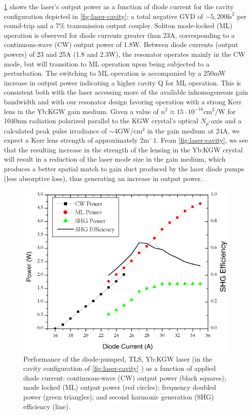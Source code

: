 \ref{fig:laser-performance} shows the laser's output power as a function of diode current for the cavity configuration depicted in \ref{fig:laser-cavity}; a total negative GVD of $-5,200\text{fs}^2$ per round-trip and a 7\% transmission output coupler.
Soliton mode-locked (ML) operation is observed for diode currents greater than 23A, corresponding to a continuous-wave (CW) output power of 1.8W.
Between diode currents (output powers) of 23 and 25A (1.8 and 2.3W), the resonator operates mainly in the CW mode, but will transition to ML operation upon being subjected to a perturbation.
The switching to ML operation is accompanied by a 250mW increase in output
power indicating a higher cavity Q for ML operation.
This is consistent both with the laser accessing more of the available inhomogeneous gain bandwidth and with our resonator design favoring operation with a strong Kerr lens in the Yb:KGW gain medium.
Given a value of $n^2 \approx 15 \cdot 10^{-16}\text{cm}^2/\text{W}$ for 1040nm radiation polarized parallel to the KGW crystal's optical $N_p$-axis \cite{Major_characterization_2003,Selivanov_nonlinear_2006,Vodchits_zscan_2006} and a calculated peak pulse irradiance of $\sim$4GW/cm$^2$ in the gain medium at 24A, we expect a Kerr lens strength of approximately 2m$^-1$.
From \ref{fig:laser-cavity}, we see that the resulting increase in the strength of the lensing in the Yb:KGW crystal will result in a reduction of the laser mode size in the gain medium, which produces a better spatial match to gain duct produced by the laser diode pumps (less absorptive loss), thus generating an increase in output power.

\begin{figure}
  \centering
  \includegraphics{performance.jpg}
  \caption[Power measuments of employed ultrast laser]{
Performance of the diode-pumped, TLS, Yb:KGW laser (in the cavity configuration of \protect\ref{fig:laser-cavity}\protect{} ) as a function of applied diode current: continuous-wave (CW) output power (black squares); mode locked (ML) output power (red circles); frequency doubled power (green triangles); and second harmonic generation (SHG) efficiency (line).
  }
  \label{fig:laser-performance}
\end{figure}

